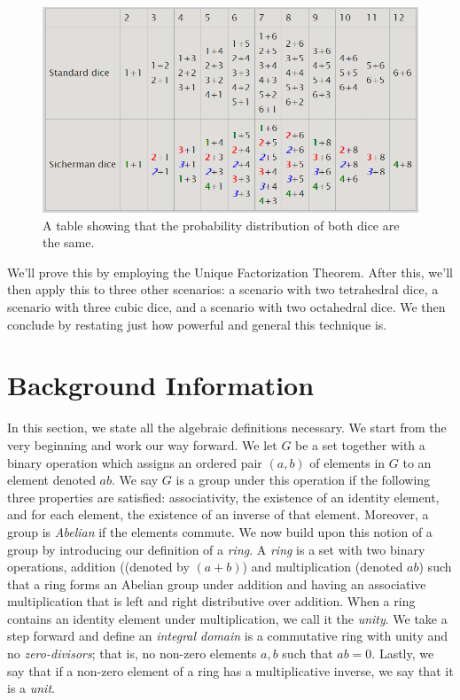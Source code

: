 \documentclass[12pt]{report}
\begin{document}
\begin{figure}[h]
  \includegraphics[width=\linewidth]{images/wikipedia_table.png}
  \caption{A table showing that the probability distribution of both dice are the same.}
  \label{fig:wikipedia_table}
\end{figure}

We'll prove this by employing the Unique Factorization Theorem. After this, we'll then apply this to three
other scenarios: a scenario with two tetrahedral dice, a scenario with three cubic dice, and a scenario with
two octahedral dice. We then conclude by restating just how powerful and general this technique is. 


\section*{Background Information}
In this section, we state all the algebraic definitions necessary. We start from the very beginning and work
our way forward. We let $G$ be a set together with a binary operation which assigns an ordered pair $(a,b)$ of
elements in $G$ to an element denoted $ab$. We say $G$ is a group under this operation if the following three
properties are satisfied: associativity, the existence of an identity element, and for each element, the
existence of an inverse of that element. Moreover, a group is \textit{Abelian} if the elements commute. We now
build upon this notion of a group by introducing our definition of a \textit{ring}. A \textit{ring} is a set
with two binary operations, addition ((denoted by $(a+b)$) and multiplication (denoted $ab$) such that a ring
forms an Abelian group under addition and having an associative multiplication that is left and right
distributive over addition. When a ring contains an identity element under multiplication, we call it the
\textit{unity}. We take a step forward and define an \textit{integral domain} is a commutative ring with unity
and no \textit{zero-divisors}; that is, no non-zero elements $a,b$ such that $ab=0$. Lastly, we say that if a
non-zero element of a ring has a multiplicative inverse, we say that it is a \textit{unit}. 
\end{document}
